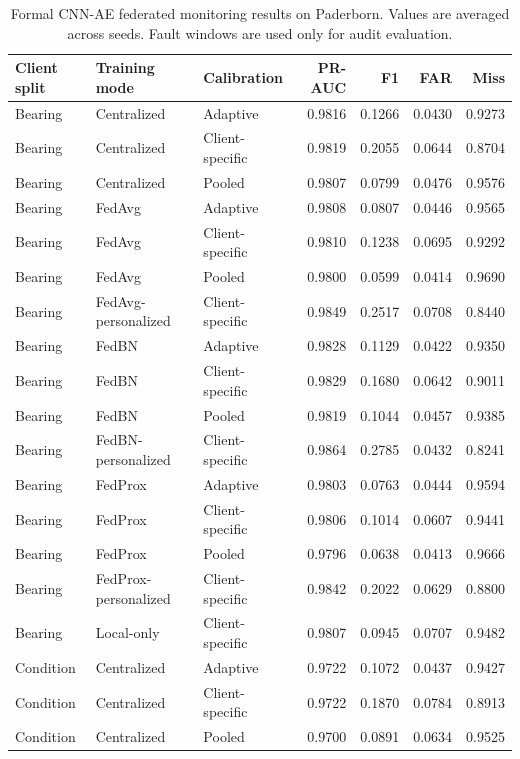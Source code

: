 \begin{table}[t]
\centering
\caption{Formal CNN-AE federated monitoring results on Paderborn. Values are averaged across seeds. Fault windows are used only for audit evaluation.}
\label{tab:main_results}
\small
\begin{tabularx}{\textwidth}{llXrrrr}
\toprule
Client split & Training mode & Calibration & PR-AUC & F1 & FAR & Miss \\
\midrule
Bearing & Centralized & Adaptive & 0.9816 & 0.1266 & 0.0430 & 0.9273 \\
Bearing & Centralized & Client-specific & 0.9819 & 0.2055 & 0.0644 & 0.8704 \\
Bearing & Centralized & Pooled & 0.9807 & 0.0799 & 0.0476 & 0.9576 \\
Bearing & FedAvg & Adaptive & 0.9808 & 0.0807 & 0.0446 & 0.9565 \\
Bearing & FedAvg & Client-specific & 0.9810 & 0.1238 & 0.0695 & 0.9292 \\
Bearing & FedAvg & Pooled & 0.9800 & 0.0599 & 0.0414 & 0.9690 \\
Bearing & FedAvg-personalized & Client-specific & 0.9849 & 0.2517 & 0.0708 & 0.8440 \\
Bearing & FedBN & Adaptive & 0.9828 & 0.1129 & 0.0422 & 0.9350 \\
Bearing & FedBN & Client-specific & 0.9829 & 0.1680 & 0.0642 & 0.9011 \\
Bearing & FedBN & Pooled & 0.9819 & 0.1044 & 0.0457 & 0.9385 \\
Bearing & FedBN-personalized & Client-specific & 0.9864 & 0.2785 & 0.0432 & 0.8241 \\
Bearing & FedProx & Adaptive & 0.9803 & 0.0763 & 0.0444 & 0.9594 \\
Bearing & FedProx & Client-specific & 0.9806 & 0.1014 & 0.0607 & 0.9441 \\
Bearing & FedProx & Pooled & 0.9796 & 0.0638 & 0.0413 & 0.9666 \\
Bearing & FedProx-personalized & Client-specific & 0.9842 & 0.2022 & 0.0629 & 0.8800 \\
Bearing & Local-only & Client-specific & 0.9807 & 0.0945 & 0.0707 & 0.9482 \\
Condition & Centralized & Adaptive & 0.9722 & 0.1072 & 0.0437 & 0.9427 \\
Condition & Centralized & Client-specific & 0.9722 & 0.1870 & 0.0784 & 0.8913 \\
Condition & Centralized & Pooled & 0.9700 & 0.0891 & 0.0634 & 0.9525 \\

\end{tabularx}
\end{table}

